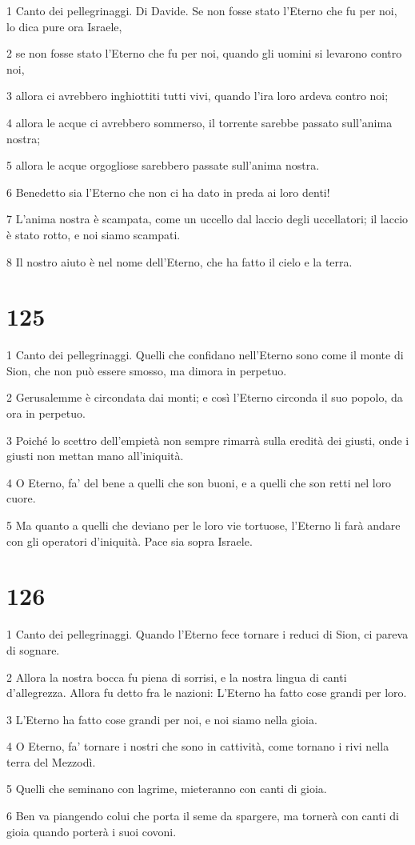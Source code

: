 \par 1 Canto dei pellegrinaggi. Di Davide. Se non fosse stato l'Eterno che fu per noi, lo dica pure ora Israele,
\par 2 se non fosse stato l'Eterno che fu per noi, quando gli uomini si levarono contro noi,
\par 3 allora ci avrebbero inghiottiti tutti vivi, quando l'ira loro ardeva contro noi;
\par 4 allora le acque ci avrebbero sommerso, il torrente sarebbe passato sull'anima nostra;
\par 5 allora le acque orgogliose sarebbero passate sull'anima nostra.
\par 6 Benedetto sia l'Eterno che non ci ha dato in preda ai loro denti!
\par 7 L'anima nostra è scampata, come un uccello dal laccio degli uccellatori; il laccio è stato rotto, e noi siamo scampati.
\par 8 Il nostro aiuto è nel nome dell'Eterno, che ha fatto il cielo e la terra.

\chapter{125}

\par 1 Canto dei pellegrinaggi. Quelli che confidano nell'Eterno sono come il monte di Sion, che non può essere smosso, ma dimora in perpetuo.
\par 2 Gerusalemme è circondata dai monti; e così l'Eterno circonda il suo popolo, da ora in perpetuo.
\par 3 Poiché lo scettro dell'empietà non sempre rimarrà sulla eredità dei giusti, onde i giusti non mettan mano all'iniquità.
\par 4 O Eterno, fa' del bene a quelli che son buoni, e a quelli che son retti nel loro cuore.
\par 5 Ma quanto a quelli che deviano per le loro vie tortuose, l'Eterno li farà andare con gli operatori d'iniquità. Pace sia sopra Israele.

\chapter{126}

\par 1 Canto dei pellegrinaggi. Quando l'Eterno fece tornare i reduci di Sion, ci pareva di sognare.
\par 2 Allora la nostra bocca fu piena di sorrisi, e la nostra lingua di canti d'allegrezza. Allora fu detto fra le nazioni: L'Eterno ha fatto cose grandi per loro.
\par 3 L'Eterno ha fatto cose grandi per noi, e noi siamo nella gioia.
\par 4 O Eterno, fa' tornare i nostri che sono in cattività, come tornano i rivi nella terra del Mezzodì.
\par 5 Quelli che seminano con lagrime, mieteranno con canti di gioia.
\par 6 Ben va piangendo colui che porta il seme da spargere, ma tornerà con canti di gioia quando porterà i suoi covoni.

